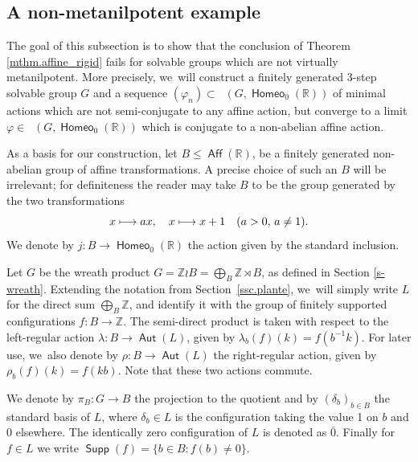 \documentclass[JEP,XML,SOM,Unicode,NoFloatCountersInSection,published]{cedram}
\def\mto{\mathchoice{\longmapsto}{\mapsto}{\mapsto}{\mapsto}}
\theoremstyle{definition}
\DeclareMathOperator{\Aff}{\mathsf{Aff}}
\DeclareMathOperator{\Aut}{\mathsf{Aut}}
\DeclareMathOperator{\homeo}{\mathsf{Homeo}}
\DeclareMathOperator{\Homirr}{\mathsf{Hom}_{\mathrm{irr}}}
\DeclareMathOperator{\supp}{\mathsf{Supp}}
\newcommand{\R}{\mathbb{R}}
\newcommand{\Z}{\mathbb Z}
\begin{document}
\subsection{A non-metanilpotent example}\label{ssc.ZwrZwrZ}
The goal of this subsection is to show that the conclusion of Theorem \ref{mthm.affine_rigid} fails for solvable groups which are not virtually metanilpotent. More precisely, we~will construct a finitely generated 3-step solvable group $G$ and a sequence $(\varphi_n)\subset \Homirr(G, \homeo_0(\R))$ of minimal actions which are not semi-conjugate to any affine action, but converge to a limit $\varphi\in \Homirr(G, \homeo_0(\R))$ which is conjugate to a non-abelian affine action.

As a basis for our construction, let $B\leq \Aff(\R)$, be a finitely generated non-abelian group of affine transformations. A precise choice of such an $B$ will be irrelevant; for definiteness the reader may take $B$ to be the group generated by the two transformations
\[ x\mto a x, \quad x\mto x+1 \quad (a>0,\,a\neq 1).
\]
We denote by $j \colon B\to \homeo_0(\R)$ the action given by the standard inclusion.

Let $G$ be the wreath product $G=\Z \wr B= \bigoplus_B\Z\rtimes B$, as defined in Section \ref{s-wreath}. Extending the notation from Section~\ref{ssc.plante}, we~will simply write $L$ for the direct sum $\bigoplus_B\Z$, and identify it with the group of finitely supported configurations $f\colon B\to \Z$. The semi-direct product is taken with respect to the left-regular action $\lambda \colon B\to \Aut(L)$, given by $\lambda_b(f)(k)=f(b^{-1}k)$. For later use, we~also denote by $\rho\colon B\to \Aut(L)$ the right-regular action, given by $\rho_b(f)(k)=f(kb)$. Note that these two actions commute.

We denote by $\pi_B\colon G\to B$ the projection to the quotient and by $(\delta_b)_{b\in B}$ the standard basis of $L$, where $\delta_b\in L $ is the configuration taking the value 1 on $b$ and $0$ elsewhere. The identically zero configuration of $L$ is denoted as $\bar{0}$. Finally for $f\in L$ we write $\supp (f)=\{b\in B : f(b)\neq 0\}$.
\end{document}
